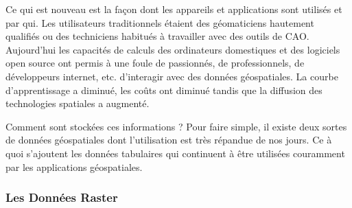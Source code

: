 Ce qui est nouveau est la fa\c{c}on dont les appareils et applications sont utilis\'es et par qui. Les utilisateurs traditionnels \'etaient des g\'eomaticiens hautement qualifi\'es ou des techniciens habitu\'es \`a travailler avec des outils de CAO. Aujourd'hui les capacit\'es de calculs des ordinateurs domestiques et des logiciels open source ont permis \`a une foule de passionn\'es, de professionnels, de d\'eveloppeurs internet, etc. d'interagir avec des donn\'ees g\'eospatiales. La courbe d'apprentissage a diminu\'e, les co\^uts ont diminu\'e tandis que la diffusion des technologies spatiales a augment\'e.

Comment sont stock\'ees ces informations ? Pour faire simple, il existe deux sortes de donn\'ees g\'eospatiales dont l'utilisation est tr\`es r\'epandue de nos jours. Ce \`a quoi s'ajoutent les donn\'ees tabulaires qui continuent \`a \^etre utilis\'ees couramment par les applications g\'eospatiales.

%
%
%

\subsubsection{Les Donn\'ees Raster}\label{label_rasterdata}

